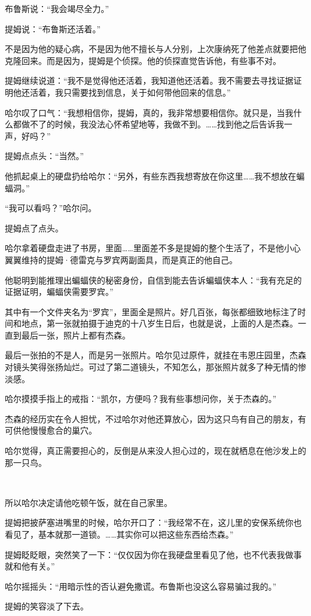 \documentclass[../main]{subfiles}
\begin{document}
布鲁斯说：“我会竭尽全力。”

提姆说：“布鲁斯还活着。”

不是因为他的疑心病，不是因为他不擅长与人分别，上次康纳死了他差点就要把他克隆回来。而是因为，提姆是个侦探。他的侦探直觉告诉他，有些事不对。

提姆继续说道：“我不是觉得他还活着，我知道他还活着。我不需要去寻找证据证明他还活着，我只需要找到信息，关于如何带他回来的信息。”

哈尔叹了口气：“我想相信你，提姆，真的，我非常想要相信你。就只是，当我什么都做不了的时候，我没法心怀希望地等，我做不到。……找到他之后告诉我一声，好吗？”

提姆点点头：“当然。”

他抓起桌上的硬盘扔给哈尔：“另外，有些东西我想寄放在你这里……我不想放在蝙蝠洞。”

“我可以看吗？”哈尔问。

提姆点了点头。

哈尔拿着硬盘走进了书房，里面……里面差不多是提姆的整个生活了，不是他小心翼翼维持的提姆·德雷克与罗宾两副面具，而是真正的他自己。

他聪明到能推理出蝙蝠侠的秘密身份，自信到能去告诉蝙蝠侠本人：“我有充足的证据证明，蝙蝠侠需要罗宾。”

其中有一个文件夹名为“罗宾”，里面全是照片。好几百张，每张都细致地标注了时间和地点，第一张就拍摄于迪克的十八岁生日后，也就是说，上面的人是杰森。一直到最后一张，照片上都有杰森。

最后一张拍的不是人，而是另一张照片。哈尔见过原件，就挂在韦恩庄园里，杰森对镜头笑得张扬灿烂。可过了第二道镜头，不知怎么，那张照片就多了种无情的惨淡感。

哈尔摸摸手指上的戒指：“凯尔，方便吗？我有些事想问你，关于杰森的。”

杰森的经历实在令人担忧，不过哈尔对他还算放心，因为这只鸟有自己的朋友，有可供他慢慢愈合的巢穴。

哈尔觉得，真正需要担心的，反倒是从来没人担心过的，现在就栖息在他沙发上的那一只鸟。

~\

所以哈尔决定请他吃顿午饭，就在自己家里。

提姆把披萨塞进嘴里的时候，哈尔开口了：“我经常不在，这儿里的安保系统你也看见了，基本就那一道锁。……其实你可以把这些东西给杰森。”

提姆眨眨眼，突然笑了一下：“仅仅因为你在我硬盘里看见了他，也不代表我做事就和他有关。”

哈尔摇摇头：“用暗示性的否认避免撒谎。布鲁斯也没这么容易骗过我的。”

提姆的笑容淡了下去。
\end{document}
